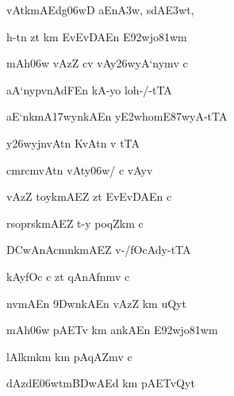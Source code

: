 {\dn vAtkmA\0Edg\0\306wD aEn\3A3w, sdA\3E3wt, \vegdn\dontdisplaylinenum}



{\dn h-t\?n zt\? km\0 EvEvDAEn E\392wjo\381wm{\dandabdn} \dontdisplaylinenum}

{\dn mAh\?\306w\2 vAzZ\2 c\4v vAy\326wyA`n\?ym\?v c \vegdn\dontdisplaylinenum}

{\dn aA`n\?ypvnAdFEn kA\2-yo loh-/-tTA{\dandabdn} \dontdisplaylinenum}

{\dn aE`nkmA\0\317wyn\?kAEn y\3E2whomE\387wyA-tTA \vegdn\dontdisplaylinenum}

{\dn {}y\0\326wyjnvAt\?n KvAt\?n v\4 tTA{\dandabdn} \dontdisplaylinenum}

{\dn cmrcm\0vAt\?n vAty\306w/\2 c vAyv \vegdn\dontdisplaylinenum}

{\dn vAzZ\2 toykmA\0EZ zt\? EvEvDAEn c{\dandabdn} \dontdisplaylinenum}

{\dn rsoprskmA\0EZ t-y poqZkm\0 c \vegdn\dontdisplaylinenum}

{\dn \3DCwAnAcmnkmA\0EZ v-/fOcAdy-tTA{\dandabdn} \dontdisplaylinenum}

{\dn kAyfOc\2 c zt\? qAnAfnm\?v c \vegdn\dontdisplaylinenum}

{\dn nvmAEn \39Dwn\?kAEn vAzZ\2 km\0 uQyt\?{\dandabdn} \dontdisplaylinenum}

{\dn mAh\?\306w\2 pAET\0v\2 km\0 an\?kAEn E\392wjo\381wm \vegdn\dontdisplaylinenum}

{\dn {}lAlkm\0km\0 km\0 pAqAZm\?v c{\dandabdn} \dontdisplaylinenum}

{\dn dAzdE\306wtm\3BDwAEd km\0 pAET\0vQyt\? \vegdn\dontdisplaylinenum}

